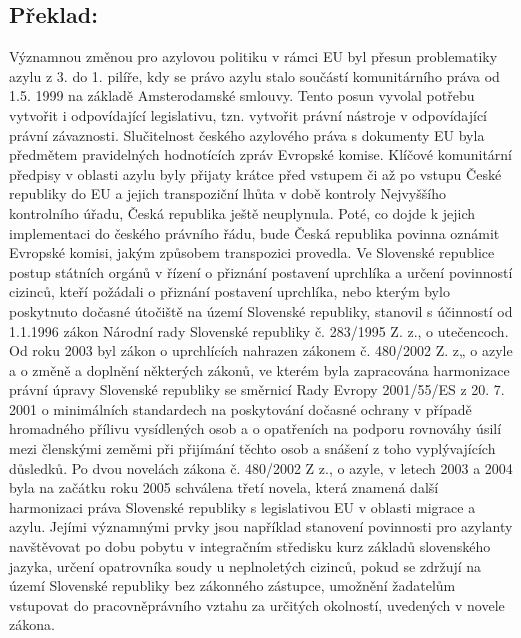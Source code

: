 \documentclass[10pt]{article}
\begin{document}
\subsection*{Překlad:}

Významnou změnou pro azylovou politiku v rámci EU byl přesun problematiky azylu z 3. do 1. pilíře, kdy se právo azylu stalo součástí komunitárního práva od 1.5. 1999 na základě Amsterodamské smlouvy.
Tento posun vyvolal potřebu vytvořit i odpovídající legislativu, tzn. vytvořit právní nástroje v odpovídající právní závaznosti.
Slučitelnost českého azylového práva s dokumenty EU byla předmětem pravidelných hodnotících zpráv Evropské komise.
Klíčové komunitární předpisy v oblasti azylu byly přijaty krátce před vstupem či až po vstupu České republiky do EU a jejich transpoziční lhůta v době kontroly Nejvyššího kontrolního úřadu, Česká republika ještě neuplynula.
Poté, co dojde k jejich implementaci do českého právního řádu, bude Česká republika povinna oznámit Evropské komisi, jakým způsobem transpozici provedla.
Ve Slovenské republice postup státních orgánů v řízení o přiznání postavení uprchlíka a určení povinností cizinců, kteří požádali o přiznání postavení uprchlíka, nebo kterým bylo poskytnuto dočasné útočiště na území Slovenské republiky, stanovil s účinností od 1.1.1996 zákon Národní rady Slovenské republiky č. 283/1995 Z. z., o utečencoch.
Od roku 2003 byl zákon o uprchlících nahrazen zákonem č. 480/2002 Z. z„ o azyle a o změně a doplnění některých zákonů, ve kterém byla zapracována harmonizace právní úpravy Slovenské republiky se směrnicí Rady Evropy 2001/55/ES z 20. 7. 2001 o minimálních standardech na poskytování dočasné ochrany v případě hromadného přílivu vysídlených osob a o opatřeních na podporu rovnováhy úsilí mezi členskými zeměmi při přijímání těchto osob a snášení z toho vyplývajících důsledků.
Po dvou novelách zákona č. 480/2002 Z z., o azyle, v letech 2003 a 2004 byla na začátku roku 2005 schválena třetí novela, která znamená další harmonizaci práva Slovenské republiky s legislativou EU v oblasti migrace a azylu.
Jejími významnými prvky jsou například stanovení povinnosti pro azylanty navštěvovat po dobu pobytu v integračním středisku kurz základů slovenského jazyka, určení opatrovníka soudy u neplnoletých cizinců, pokud se zdržují na území Slovenské republiky bez zákonného zástupce, umožnění žadatelům vstupovat do pracovněprávního vztahu za určitých okolností, uvedených v novele zákona.
\end{document}
